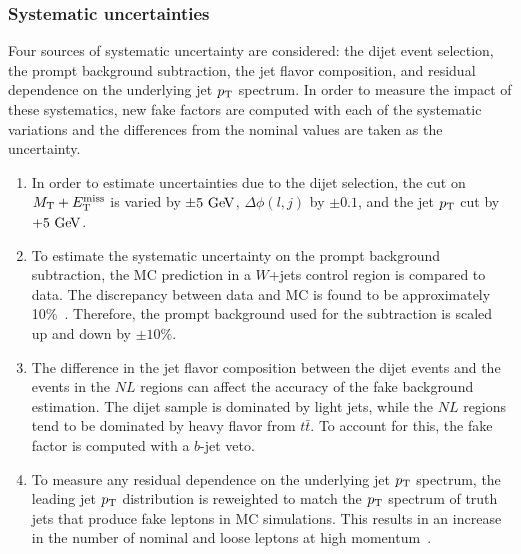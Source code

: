 \subsubsection{Systematic uncertainties}\label{ssww13tev:ff_systematics}
Four sources of systematic uncertainty are considered: the dijet event selection, the prompt background subtraction, the jet flavor composition, and residual dependence on the underlying jet $p_{\mathrm{T}}$ spectrum.
In order to measure the impact of these systematics, new fake factors are computed with each of the systematic variations and the differences from the nominal values are taken as the uncertainty.
\begin{enumerate}
\item In order to estimate uncertainties due to the dijet selection, the cut on $M_{\textrm{T}}+E_{\mathrm{T}}^{\mathrm{miss}}$ is varied by $\pm5\gev$, $\Delta\phi(l,j)$ by $\pm 0.1$, and the jet $p_{\mathrm{T}}$ cut by $+5\gev$.
\item To estimate the systematic uncertainty on the prompt background subtraction, the MC prediction in a $W$+jets control region is compared to data.  The discrepancy between data and MC is found to be approximately 10\%~\cite{2018.ssww-13tev-atlas-support}.  Therefore, the prompt background used for the subtraction is scaled up and down by $\pm 10\%$.
\item The difference in the jet flavor composition between the dijet events and the events in the $NL$ regions can affect the accuracy of the fake background estimation.  The dijet sample is dominated by light jets, while the $NL$ regions tend to be dominated by heavy flavor from $t\bar{t}$.  To account for this, the fake factor is computed with a $b$-jet veto.
\item To measure any residual dependence on the underlying jet $p_{\mathrm{T}}$ spectrum, the leading jet $p_{\mathrm{T}}$ distribution is reweighted to match the $p_{\mathrm{T}}$ spectrum of truth jets that produce fake leptons in MC simulations.  This results in an increase in the number of nominal and loose leptons at high momentum~\cite{2018.ssww-13tev-atlas-support}.
\end{enumerate}

